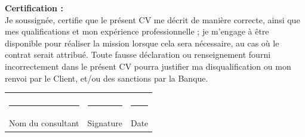 \documentclass[10pt,a4paper]{article}
\newcommand{\fieldlabel}[1]{\textbf{#1}}
\begin{document}
\vspace{0.75em}
\fieldlabel{\large Certification :}\\
Je soussign\'ee, certifie que le pr\'esent CV me d\'ecrit de mani\`ere correcte, ainsi que mes qualifications et mon exp\'erience professionnelle ; je m'engage \`a \^etre disponible pour r\'ealiser la mission lorsque cela sera n\'ecessaire, au cas o\`u le contrat serait attribu\'e. Toute fausse d\'eclaration ou renseignement fourni incorrectement dans le pr\'esent CV pourra justifier ma disqualification ou mon renvoi par le Client, et/ou des sanctions par la Banque.

\vspace{1.0em}
\begin{tabularx}{\textwidth}{X X X}
& & \\
\rule{0.30\textwidth}{0.4pt} & \rule{0.30\textwidth}{0.4pt} & \rule{0.18\textwidth}{0.4pt} \\
Nom du consultant & Signature & Date \\
\end{tabularx}
\end{document}
